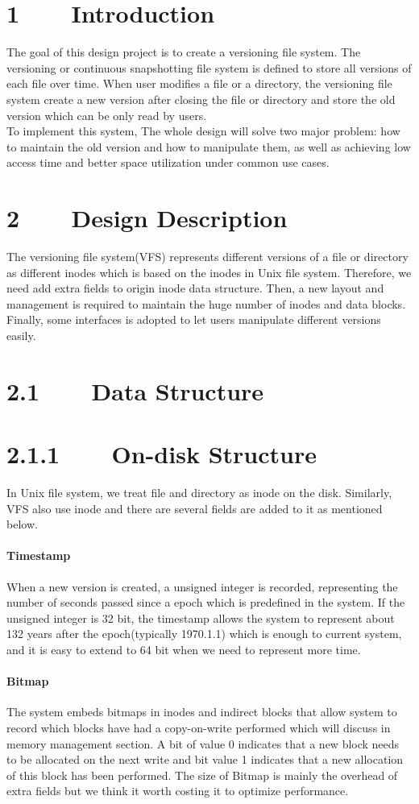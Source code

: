 \section*{1~~~~Introduction}The goal of this design project is to create a versioning file system. The versioning or continuous snapshotting file system is defined to store all versions of each file over time. When user modifies a file or  a directory, the versioning file system create a new version after closing the file or directory and store the old version which can be only read by users. \\[1em]To implement this system, The whole design will solve two major problem: how to maintain the old version and how to manipulate them, as well as achieving low access time and better space utilization under common use cases.
\section*{2~~~~Design Description}
The versioning file system(VFS) represents different versions of a file or directory as different inodes which is based on the inodes in Unix file system. Therefore, we need add extra fields to origin inode data structure. Then, a new layout and management is required to maintain the huge number of inodes and data blocks. Finally, some interfaces is adopted to let users manipulate different versions easily.
\section*{2.1~~~~Data Structure}
\section*{2.1.1~~~~On-disk Structure}
In Unix file system, we treat file and directory as inode on the disk. Similarly, VFS also use inode and there are several fields are added to it as mentioned below. 
\paragraph{Timestamp}When a new version is created, a unsigned integer is recorded, representing the number of seconds passed since a epoch which is predefined in the system. If the unsigned integer is 32 bit, the timestamp allows the system to represent about 132 years after the epoch(typically 1970.1.1) which is enough to current system, and it is easy to extend to 64 bit when we need to represent more time. 
\paragraph{Bitmap}The system embeds bitmaps in inodes and indirect blocks that allow system to record which blocks have had a copy-on-write performed which will discuss in memory management section. A bit of value 0 indicates that a new block needs to be allocated on the next write and bit value 1 indicates that a new allocation of this block has been performed. The size of Bitmap is mainly the overhead of extra fields but we think it worth costing it to optimize performance.
